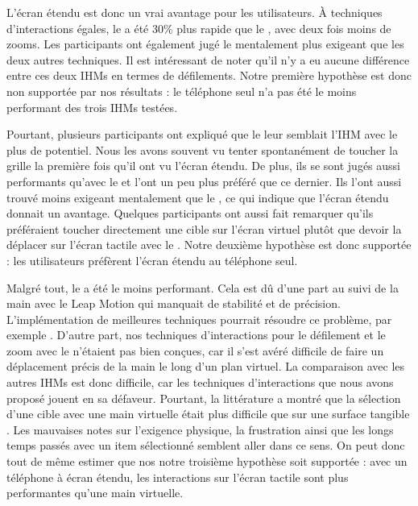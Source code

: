 
L'écran étendu est donc un vrai avantage pour les utilisateurs. À techniques d'interactions égales, le  a été 30\% plus rapide que le , avec deux fois moins de zooms. Les participants ont également jugé le  mentalement plus exigeant que les deux autres techniques. Il est intéressant de noter qu'il n'y a eu aucune différence entre ces deux IHMs en termes de défilements. Notre première hypothèse est donc non supportée par nos résultats : le téléphone seul n'a pas été le moins performant des trois IHMs testées.

Pourtant, plusieurs participants ont expliqué que le  leur semblait l'IHM avec le plus de potentiel. Nous les avons souvent vu tenter spontanément de toucher la grille la première fois qu'il ont vu l'écran étendu. De plus, ils se sont jugés aussi performants qu'avec le  et l'ont un peu plus préféré que ce dernier. Ils l'ont aussi trouvé moins exigeant mentalement que le , ce qui indique que l'écran étendu donnait un avantage. Quelques participants ont aussi fait remarquer qu'ils préféraient toucher directement une cible sur l'écran virtuel plutôt que devoir la déplacer sur l'écran tactile avec le . Notre deuxième hypothèse est donc supportée : les utilisateurs préfèrent l'écran étendu au téléphone seul.

Malgré tout, le  a été le moins performant. Cela est dû d'une part au suivi de la main avec le Leap Motion qui manquait de stabilité et de précision. L'implémentation de meilleures techniques pourrait résoudre ce problème, par exemple \cite{Taylor2016}. D'autre part, nos techniques d'interactions pour le défilement et le zoom avec le  n'étaient pas bien conçues, car il s'est avéré difficile de faire un déplacement précis de la main le long d'un plan virtuel. La comparaison avec les autres IHMs est donc difficile, car les techniques d'interactions que nous avons proposé jouent en sa défaveur. Pourtant, la littérature a montré que la sélection d'une cible avec une main virtuelle était plus difficile que sur une surface tangible \citep{Chan2010, Jones2012, Argelaguet2013}. Les mauvaises notes sur l'exigence physique, la frustration ainsi que les longs temps passés avec un item sélectionné semblent aller dans ce sens. On peut donc tout de même estimer que nos notre troisième hypothèse soit supportée : avec un téléphone à écran étendu, les interactions sur l'écran tactile sont plus performantes qu'une main virtuelle.

